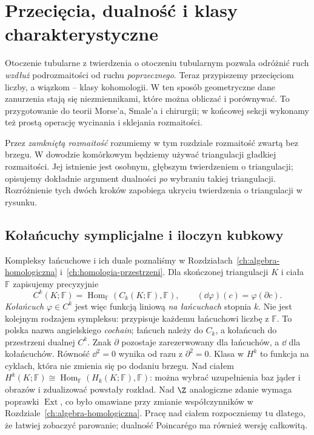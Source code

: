 \chapter{Przecięcia, dualność i klasy charakterystyczne}
\label{ch:przeciecia-dualnosc-klasy}

\providecommand{\atlasref}[2]{#2}

Otoczenie tubularne z twierdzenia o otoczeniu tubularnym
pozwala odróżnić ruch \emph{wzdłuż} podrozmaitości
od ruchu \emph{poprzecznego}. Teraz przypiszemy
przecięciom liczby, a wiązkom -- klasy kohomologii.
W ten sposób geometryczne dane zanurzenia stają się
niezmiennikami, które można obliczać i porównywać.
To przygotowanie do teorii Morse'a, Smale'a i chirurgii;
w końcowej sekcji wykonamy też prostą operację
wycinania i sklejania rozmaitości.

Przez \emph{zamkniętą rozmaitość} rozumiemy w tym
rozdziale rozmaitość zwartą bez brzegu. W dowodzie
komórkowym będziemy używać triangulacji gładkiej
rozmaitości. Jej istnienie jest osobnym, głębszym
twierdzeniem o triangulacji; opisujemy dokładnie
argument dualności \emph{po} wybraniu takiej
triangulacji. Rozróżnienie tych dwóch kroków
zapobiega ukryciu twierdzenia o triangulacji
w rysunku.

\section{Kołańcuchy symplicjalne i iloczyn kubkowy}
\label{sec:kubek-16}

Kompleksy łańcuchowe i ich duale poznaliśmy
w Rozdziałach~\ref{ch:algebra-homologiczna}
i~\ref{ch:homologia-przestrzeni}. Dla
skończonej triangulacji $K$ i ciała $\mathbb F$
zapisujemy precyzyjnie
\[
 C^k(K;\mathbb F)
   =\operatorname{Hom}_{\mathbb F}
       (C_k(K;\mathbb F),\mathbb F),
 \qquad
 (\dd\varphi)(c)=\varphi(\partial c).
\]
\emph{Kołańcuch} $\varphi\in C^k$ jest więc
funkcją liniową \emph{na łańcuchach} stopnia $k$.
Nie jest kolejnym rodzajem sympleksu:
przypisuje każdemu łańcuchowi liczbę z
$\mathbb F$. To polska nazwa angielskiego
\emph{cochain}; łańcuch należy do $C_k$,
a kołańcuch do przestrzeni dualnej $C^k$.
Znak $\partial$ pozostaje zarezerwowany
dla łańcuchów, a $\dd$ dla kołańcuchów.
Równość $\dd^2=0$ wynika od razu z
$\partial^2=0$. Klasa w $H^k$ to
funkcja na cyklach, która nie zmienia
się po dodaniu brzegu. Nad ciałem
$H^k(K;\mathbb F)\cong
\operatorname{Hom}_{\mathbb F}(H_k(K;\mathbb F),\mathbb F)$:
można wybrać uzupełnienia baz jąder
i obrazów i zdualizować powstały
rozkład. Nad $\Z$ analogiczne zdanie
wymaga poprawki $\operatorname{Ext}$,
co było omawiane przy zmianie
współczynników w Rozdziale~\ref{ch:algebra-homologiczna}.
Pracę nad ciałem rozpoczniemy tu dlatego,
że łatwiej zobaczyć parowanie;
dualność Poincarégo ma również
wersję całkowitą.

